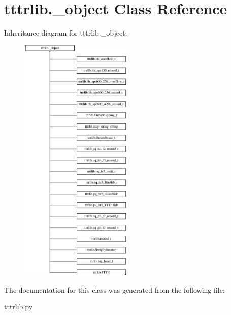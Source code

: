 \hypertarget{classtttrlib_1_1__object}{}\section{tttrlib.\+\_\+object Class Reference}
\label{classtttrlib_1_1__object}
Inheritance diagram for tttrlib.\+\_\+object\+:\begin{figure}[H]
\begin{center}
\leavevmode
\includegraphics[height=12.000000cm]{classtttrlib_1_1__object}
\end{center}
\end{figure}


The documentation for this class was generated from the following file\+:\begin{DoxyCompactItemize}
\item 
tttrlib.\+py\end{DoxyCompactItemize}
